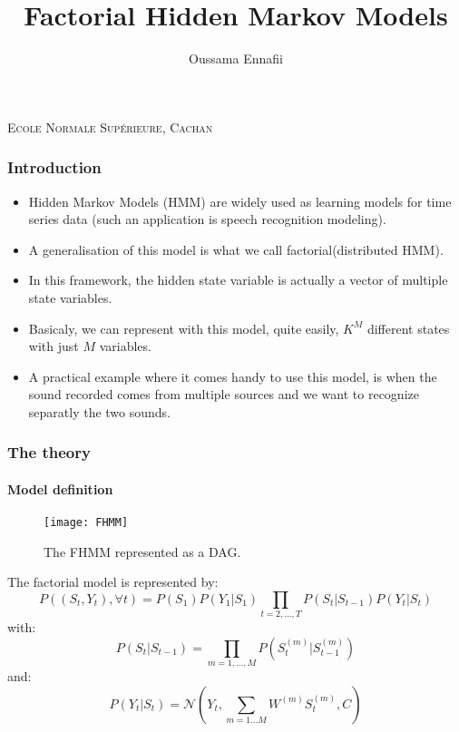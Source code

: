 \documentclass{beamer}
\title{Factorial Hidden Markov Models}
\author{Oussama Ennafii}
\begin{document}
    \begin{frame}
    
   	\maketitle
   	
   	\begin{center}
   	\textsc{Ecole Normale Sup\'erieure, Cachan}
   	\end{center}
   	
    \end{frame}
    
    \begin{frame}[label=introduction]
    \frametitle{Introduction}
    \begin{itemize}
    \item Hidden Markov Models (HMM) are widely used as learning models for time series data (such an application is speech recognition modeling).
    \item A generalisation of this model is what we call factorial(distributed HMM).
    \item In this framework, the hidden state variable is actually a vector of multiple state variables.
    \item Basicaly, we can represent with this model, quite easily, $K^M$ different states with just $M$ variables.
    \item A practical example where it comes handy to use this model, is when the sound recorded comes from multiple sources and we want to recognize separatly the two sounds.
    \end{itemize}
    
    \end{frame}
    
    \begin{frame}
    
    \frametitle{The theory}
    \framesubtitle{Model definition}
    
    \begin{figure}
    \caption{The FHMM represented as a DAG.}
    \texttt{[image: FHMM]}
    \end{figure}
    
    \end{frame}
    
    \begin{frame}
    The factorial model is represented by:
    \begin{equation}
    P((S_t,Y_t),\forall t)=P(S_1)P(Y_1|S_1)\prod_{t=2,...,T}P(S_t|S_{t-1})P(Y_t|S_t)
    \end{equation}
    with:
    \begin{equation}
    P(S_t|S_{t-1})=\prod_{m=1,...,M} P(S_t^{(m)}|S_{t-1}^{(m)})
    \end{equation}
    and:
    \begin{equation}
    P(Y_t|S_t)=\mathscr{N}(Y_t,\sum_{m=1...M} W^{(m)}S_t^{(m)},C)
    \end{equation}
    
    \end{frame}
    
\end{document}
